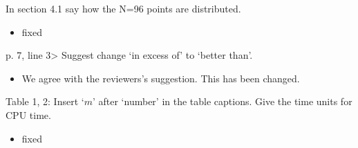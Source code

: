 \documentclass[12pt]{article}
\newcommand{\comment}[1]{{\color{blue} #1}}
\begin{document}
\noindent
\comment{In section 4.1 say how the N=96 points are distributed.}
\begin{itemize}
\item fixed
\end{itemize}

\noindent
\comment{p. 7, line 3> Suggest change `in excess of' to `better than'.}
\begin{itemize}
\item We agree with the reviewers's suggestion.  This has been changed.
\end{itemize}

\noindent
\comment{Table 1, 2: Insert `$m$' after `number' in the table captions.
Give the time units for CPU time.}
\begin{itemize}
\item fixed
\end{itemize}
\end{document}

